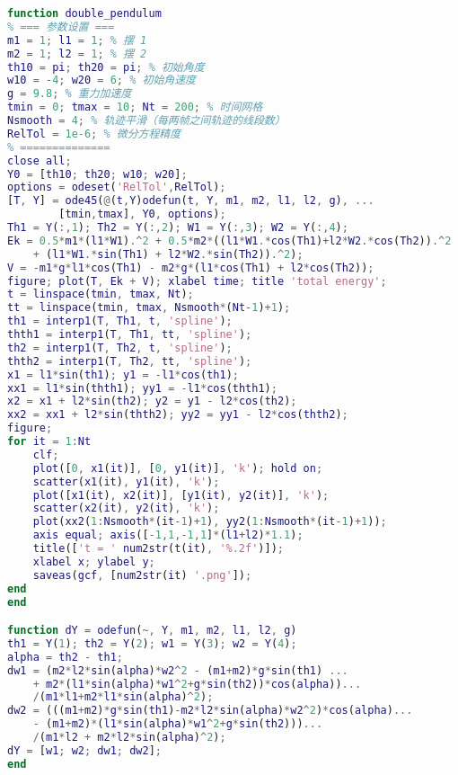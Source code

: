 \begin{lstlisting}[language=matlab, caption=double\_pendulum.m]
% 双摆运动
function double_pendulum
% === 参数设置 ===
m1 = 1; l1 = 1; % 摆 1
m2 = 1; l2 = 1; % 摆 2
th10 = pi; th20 = pi; % 初始角度
w10 = -4; w20 = 6; % 初始角速度
g = 9.8; % 重力加速度
tmin = 0; tmax = 10; Nt = 200; % 时间网格
Nsmooth = 4; % 轨迹平滑（每两帧之间轨迹的线段数）
RelTol = 1e-6; % 微分方程精度
% ==============
close all;
Y0 = [th10; th20; w10; w20];
options = odeset('RelTol',RelTol);
[T, Y] = ode45(@(t,Y)odefun(t, Y, m1, m2, l1, l2, g), ...
        [tmin,tmax], Y0, options);
Th1 = Y(:,1); Th2 = Y(:,2); W1 = Y(:,3); W2 = Y(:,4);
Ek = 0.5*m1*(l1*W1).^2 + 0.5*m2*((l1*W1.*cos(Th1)+l2*W2.*cos(Th2)).^2 ...
    + (l1*W1.*sin(Th1) + l2*W2.*sin(Th2)).^2);
V = -m1*g*l1*cos(Th1) - m2*g*(l1*cos(Th1) + l2*cos(Th2));
figure; plot(T, Ek + V); xlabel time; title 'total energy';
t = linspace(tmin, tmax, Nt);
tt = linspace(tmin, tmax, Nsmooth*(Nt-1)+1);
th1 = interp1(T, Th1, t, 'spline');
thth1 = interp1(T, Th1, tt, 'spline');
th2 = interp1(T, Th2, t, 'spline');
thth2 = interp1(T, Th2, tt, 'spline');
x1 = l1*sin(th1); y1 = -l1*cos(th1);
xx1 = l1*sin(thth1); yy1 = -l1*cos(thth1);
x2 = x1 + l2*sin(th2); y2 = y1 - l2*cos(th2);
xx2 = xx1 + l2*sin(thth2); yy2 = yy1 - l2*cos(thth2);
figure;
for it = 1:Nt
    clf;
    plot([0, x1(it)], [0, y1(it)], 'k'); hold on;
    scatter(x1(it), y1(it), 'k');
    plot([x1(it), x2(it)], [y1(it), y2(it)], 'k');
    scatter(x2(it), y2(it), 'k');
    plot(xx2(1:Nsmooth*(it-1)+1), yy2(1:Nsmooth*(it-1)+1));
    axis equal; axis([-1,1,-1,1]*(l1+l2)*1.1);
    title(['t = ' num2str(t(it), '%.2f')]);
    xlabel x; ylabel y;
    saveas(gcf, [num2str(it) '.png']);
end
end

function dY = odefun(~, Y, m1, m2, l1, l2, g)
th1 = Y(1); th2 = Y(2); w1 = Y(3); w2 = Y(4);
alpha = th2 - th1;
dw1 = (m2*l2*sin(alpha)*w2^2 - (m1+m2)*g*sin(th1) ...
    + m2*(l1*sin(alpha)*w1^2+g*sin(th2))*cos(alpha))...
    /(m1*l1+m2*l1*sin(alpha)^2);
dw2 = (((m1+m2)*g*sin(th1)-m2*l2*sin(alpha)*w2^2)*cos(alpha)...
    - (m1+m2)*(l1*sin(alpha)*w1^2+g*sin(th2)))...
    /(m1*l2 + m2*l2*sin(alpha)^2);
dY = [w1; w2; dw1; dw2];
end
\end{lstlisting}

